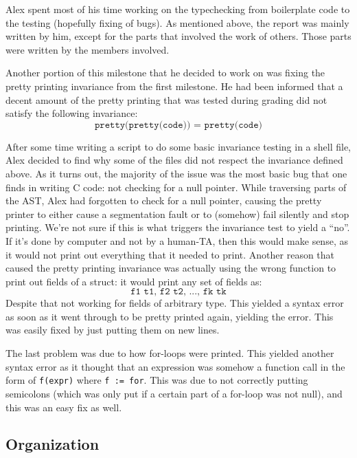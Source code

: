 \documentclass{article}
\begin{document}
Alex spent most of his time working on the typechecking from boilerplate code
to the testing (hopefully fixing of bugs). As mentioned above, the report was
mainly written by him, except for the parts that involved the work of others.
Those parts were written by the members involved.

Another portion of this milestone that he decided to work on was fixing the pretty printing invariance from the first milestone.
He had been informed that a decent amount of the pretty printing that was tested during grading did not satisfy the following invariance:
\[
    \texttt{pretty(pretty(code)) = pretty(code)}
\]

After some time writing a script to do some basic invariance testing in a shell
file, Alex decided to find why some of the files did not respect the
invariance defined above. As it turns out, the majority of the issue was the
most basic bug that one finds in writing C code: not checking for a null pointer.
While traversing parts of the AST, Alex had forgotten to check for a null
pointer, causing the pretty printer to either cause a segmentation fault or to
(somehow) fail silently and stop printing. We're not sure if this is what
triggers the invariance test to yield a ``no''. If it's done by computer and
not by a human-TA, then this would make sense, as it would not print out everything that it needed to print. Another reason that caused the pretty
printing invariance was actually using the wrong function to print out fields
of a struct: it would print any set of fields as:
\[
    \texttt{f1 t1, f2 t2, ..., fk tk}
\]
Despite that not working for fields of arbitrary type. This yielded a syntax error as
soon as it went through to be pretty printed again, yielding the error. This was easily fixed by just putting them on new lines.

The last problem was due to how for-loops were printed. This yielded another
syntax error as it thought that an expression was somehow a function call in the
form of \verb$f(expr)$ where \verb$f := for$. This was due
to not correctly putting semicolons (which was only put if a certain part of a
for-loop was not null), and this was an easy fix as well.

\subsection{Organization}

\end{document}
